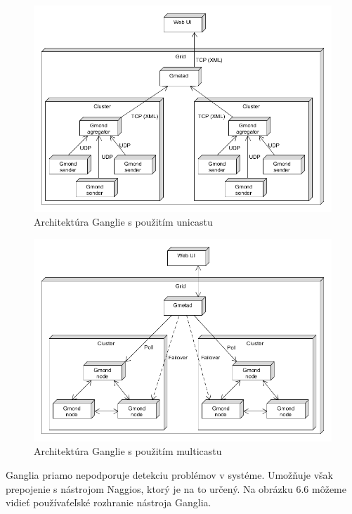 \documentclass[a4paper, upjsfrontpage, disablespecwarning, thesismargins, thesislinespacing]{rnthesis}
\begin{document}
\begin{figure}
	\begin{center}
		\includegraphics[scale=0.55]{ganglia-architecture.png}
	\end{center}
	\caption{Architektúra Ganglie s použitím unicastu}
\end{figure}

\begin{figure}
	\begin{center}
		\includegraphics[scale=0.55]{ganglia-architecture-multicast.png}
	\end{center}
	\caption{Architektúra Ganglie s použitím multicastu}
\end{figure}


Ganglia priamo nepodporuje detekciu problémov v systéme.
Umožňuje však prepojenie s nástrojom Naggios, ktorý je na to určený.
Na obrázku 6.6 môžeme vidieť používaťeľské rozhranie nástroja Ganglia.
\end{document}
